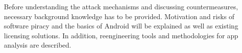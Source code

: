 Before understanding the attack mechanisms and discussing countermeasures, necessary background knowledge has to be provided.
Motivation and risks of software piracy and the basics of Android will be explained as well as existing licensing solutions. In addition, reengineering tools and methodologies for app analysis are described.
